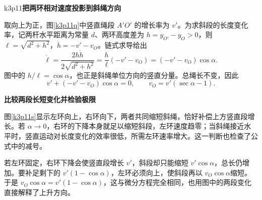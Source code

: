 \begin{drillsolution}{k3p11}\textbf{把两环相对速度投影到斜绳方向}\par\nobreak
取向上为正，图\ref{k3p11q}中竖直绳段 $A'O'$ 的增长率为 $v'$。为求斜段的长度变化率，记两杆水平距离为常量 $d$、两环高度差为 $h=y_{O'}-y_O>0$，则 $\ell=\sqrt{d^2+h^2}$，$\dot h=-v'-v_O$。链式求导给出
\[
 \dot\ell=\frac{2h\dot h}{2\sqrt{d^2+h^2}}
 =\frac h\ell(-v'-v_O)=(-v'-v_O)\cos\alpha.
\]
图中的 $h/\ell=\cos\alpha$，也正是斜绳单位方向的竖直分量。总绳长不变，因此
\[v'+(-v'-v_O)\cos\alpha=0,\qquad\boxed{v_O=v'(\sec\alpha-1)}.\]



\par\medskip{}\noindent\textbf{比较两段长短变化并检验极限}\par\nobreak
图\ref{k3p11s}显示左环向上，右环向下，两者共同缩短斜绳，恰好补偿上方竖直段增长。若 $\alpha\to0$，右环的下降本身就足以缩短斜段，左环速度趋零；当斜绳接近水平时，竖直运动对长度变化的效率很低，所需左环速率增大。这一判断也检查了公式中的减号。

若左环固定，右环下降会使竖直段增长 $v'$，斜段却只能缩短 $v'\cos\alpha$，总长仍增加。要补足剩下的 $v'(1-\cos\alpha)$，左环必须向上，使斜段再以 $v_O\cos\alpha$缩短。于是 $v_O\cos\alpha=v'(1-\cos\alpha)$，这与微分方程完全相同，也用图中的两段变化直接解释了上升方向。\end{drillsolution}

